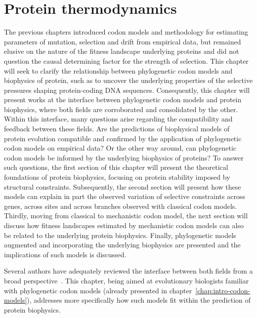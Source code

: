 \chapter{Protein thermodynamics}
{\hypersetup{linkcolor=GREYDARK}\minitoc}
\label{chap:intro-physic-proteins}

The previous chapters introduced \gls{codon} models and methodology for estimating parameters of mutation, selection and drift from empirical data, but remained elusive on the nature of the fitness landscape underlying proteins and did not question the causal determining factor for the strength of selection.
This chapter will seek to clarify the relationship between phylogenetic \gls{codon} models and biophysics of protein, such as to uncover the underlying properties of the selective pressures shaping protein-coding \acrshort{DNA} sequences.
Consequently, this chapter will present works at the interface between phylogenetic \gls{codon} models and protein biophysics, where both fields are corroborated and consolidated by the other.
Within this interface, many questions arise regarding the compatibility and feedback between these fields.
Are the predictions of biophysical models of protein evolution compatible and confirmed by the application of phylogenetic \gls{codon} models on empirical data?
Or the other way around, can phylogenetic \gls{codon} models be informed by the underlying biophysics of proteins?
To answer such questions, the first section of this chapter will present the theoretical foundations of protein biophysics, focusing on protein stability imposed by structural constraints.
Subsequently, the second section will present how these models can explain in part the observed variation of selective constraints across genes, across sites and across branches observed with classical \gls{codon} models.
Thirdly, moving from classical to mechanistic \gls{codon} model, the next section will discuss how fitness landscapes estimated by mechanistic \gls{codon} models can also be related to the underlying protein biophysics.
Finally, phylogenetic models augmented and incorporating the underlying biophysics are presented and the implications of such models is discussed.

Several authors have adequately reviewed the interface between both fields from a broad perspective~\citep{Liberles2012,Serohijos2014,Sikosek2014,Arenas2015,Echave2017,Bastolla2017}. This chapter, being aimed at evolutionary biologists familiar with phylogenetic \gls{codon} models (already presented in chapter~\ref{chap:intro-codon-models}), addresses more specifically how such models fit within the prediction of protein biophysics.

